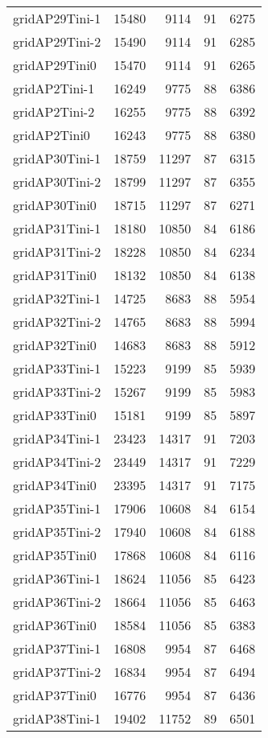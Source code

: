 \begin{longtable}{lrrrr}
gridAP29Tini-1 & 15480 & 9114 & 91 & 6275 \\
gridAP29Tini-2 & 15490 & 9114 & 91 & 6285 \\
gridAP29Tini0 & 15470 & 9114 & 91 & 6265 \\
gridAP2Tini-1 & 16249 & 9775 & 88 & 6386 \\
gridAP2Tini-2 & 16255 & 9775 & 88 & 6392 \\
gridAP2Tini0 & 16243 & 9775 & 88 & 6380 \\
gridAP30Tini-1 & 18759 & 11297 & 87 & 6315 \\
gridAP30Tini-2 & 18799 & 11297 & 87 & 6355 \\
gridAP30Tini0 & 18715 & 11297 & 87 & 6271 \\
gridAP31Tini-1 & 18180 & 10850 & 84 & 6186 \\
gridAP31Tini-2 & 18228 & 10850 & 84 & 6234 \\
gridAP31Tini0 & 18132 & 10850 & 84 & 6138 \\
gridAP32Tini-1 & 14725 & 8683 & 88 & 5954 \\
gridAP32Tini-2 & 14765 & 8683 & 88 & 5994 \\
gridAP32Tini0 & 14683 & 8683 & 88 & 5912 \\
gridAP33Tini-1 & 15223 & 9199 & 85 & 5939 \\
gridAP33Tini-2 & 15267 & 9199 & 85 & 5983 \\
gridAP33Tini0 & 15181 & 9199 & 85 & 5897 \\
gridAP34Tini-1 & 23423 & 14317 & 91 & 7203 \\
gridAP34Tini-2 & 23449 & 14317 & 91 & 7229 \\
gridAP34Tini0 & 23395 & 14317 & 91 & 7175 \\
gridAP35Tini-1 & 17906 & 10608 & 84 & 6154 \\
gridAP35Tini-2 & 17940 & 10608 & 84 & 6188 \\
gridAP35Tini0 & 17868 & 10608 & 84 & 6116 \\
gridAP36Tini-1 & 18624 & 11056 & 85 & 6423 \\
gridAP36Tini-2 & 18664 & 11056 & 85 & 6463 \\
gridAP36Tini0 & 18584 & 11056 & 85 & 6383 \\
gridAP37Tini-1 & 16808 & 9954 & 87 & 6468 \\
gridAP37Tini-2 & 16834 & 9954 & 87 & 6494 \\
gridAP37Tini0 & 16776 & 9954 & 87 & 6436 \\
gridAP38Tini-1 & 19402 & 11752 & 89 & 6501 \\

\end{longtable}
